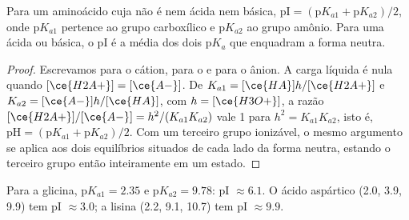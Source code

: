 \begin{proposition}\label{prop:b2:biomolecules:pi}
Para um aminoácido cuja  não é nem ácida nem básica, $\mathrm{pI} = (\mathrm pK_{a1} +
\mathrm pK_{a2})/2$, onde $\mathrm pK_{a1}$ pertence ao grupo carboxílico e $\mathrm pK_{a2}$ ao
grupo amônio. Para uma  ácida ou básica, o pI é a média dos dois $\mathrm pK_a$ que
enquadram a forma neutra.
\end{proposition}

\begin{proof}
Escrevamos  para o cátion,  para o  e  para o ânion. A carga líquida é
nula quando $[\ce{H2A+}] = [\ce{A-}]$. De $K_{a1} = [\ce{HA}]h/[\ce{H2A+}]$ e $K_{a2} =
[\ce{A-}]h/[\ce{HA}]$, com $h = [\ce{H3O+}]$, a razão $[\ce{H2A+}]/[\ce{A-}] = h^2/(K_{a1}K_{a2})$
vale 1 para $h^2 = K_{a1}K_{a2}$, isto é, $\mathrm{pH} = (\mathrm pK_{a1} + \mathrm pK_{a2})/2$. Com um
terceiro grupo ionizável, o mesmo argumento se aplica aos dois equilíbrios situados de cada lado da
forma neutra, estando o terceiro grupo então inteiramente em um estado.
\end{proof}

Para a glicina, $\mathrm pK_{a1} = 2.35$ e $\mathrm pK_{a2} = 9.78$: pI $\approx 6.1$. O ácido aspártico
(2.0, 3.9, 9.9) tem pI $\approx 3.0$; a lisina (2.2, 9.1, 10.7) tem pI $\approx 9.9$.

